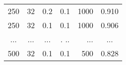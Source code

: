 \begin{table}[H]
\begin{tabular}{c|c|c|c|r|c}
    250                                & 32                             & 0.2                         & 0.1                                  & 1000                                & 0.910                  \\
    250                                & 32                             & 0.1                         & 0.1                                  & 1000                                & 0.906                  \\
    ...                                & ...                            & ...                         &. ..                                  & ...                                 & ...                    \\
    500                                & 32                             & 0.1                         & 0.1                                  & 500                                 & 0.828                  \\ 
    \hline               
    \end{tabular}
\end{table}
